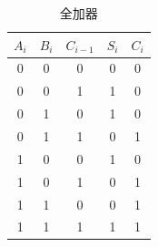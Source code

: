 \documentclass[a4paper,twoside]{ctexart}
\begin{document}
\begin{spacing}{1.2}
\begin{table}[htbp]
	\centering
	\caption{全加器}
	\label{tbl:resfulladder2}
	\begin{tabular}{ccc|cc}
		\toprule
		\hline
		$A_i$&$B_i$&$C_{i-1}$&$S_i$&$C_i$\\
		\hline
		0&0&0&0&0\\
		0&0&1&1&0\\
		0&1&0&1&0\\
		0&1&1&0&1\\
		1&0&0&1&0\\
		1&0&1&0&1\\
		1&1&0&0&1\\
		1&1&1&1&1\\
		\hline
		\bottomrule
	\end{tabular}
\end{table}

\end{spacing}
\end{document}
